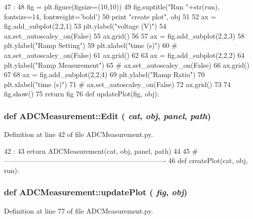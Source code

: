 \begin{DoxyCode}
47                              :
48     fig = plt.figure(figsize=(10,10))
49     fig.suptitle("Run "+str(run), fontsize=14, fontweight='bold')
50     print "create plot", obj
51 
52     ax = fig.add_subplot(2,2,1)
53     plt.ylabel("voltage (V)")
54     ax.set_autoscaley_on(False)
55     ax.grid()
56 
57     ax = fig.add_subplot(2,2,3)
58     plt.ylabel("Ramp Setting")
59     plt.xlabel("time (s)")
60 #    ax.set_autoscaley_on(False)
61     ax.grid()
62 
63     ax = fig.add_subplot(2,2,2)
64     plt.ylabel("Ramp Measurement")
65 #    ax.set_autoscaley_on(False)
66     ax.grid()        
67 
68     ax = fig.add_subplot(2,2,4)
69     plt.ylabel("Ramp Ratio")
70     plt.xlabel("time (s)")
71  #   ax.set_autoscaley_on(False)
72     ax.grid()        
73 
74     fig.show()    
75     return fig
76 
def updatePlot(fig, obj):
\end{DoxyCode}
\hypertarget{namespaceADCMeasurement_a201fc534845b6f266457f888b7544a42}{
\subsubsection[{Edit}]{\setlength{\rightskip}{0pt plus 5cm}def ADCMeasurement::Edit ( {\em cat}, \/   {\em obj}, \/   {\em panel}, \/   {\em path})}}
\label{namespaceADCMeasurement_a201fc534845b6f266457f888b7544a42}


Definition at line 42 of file ADCMeasurement.py.


\begin{DoxyCode}
42                                 :
43     return ADCMeasurement(cat, obj, panel, path)
44 
45 #----------------------------------------------------------------------
46 
def createPlot(cat, obj, run):
\end{DoxyCode}
\hypertarget{namespaceADCMeasurement_a711a07185db6732546b49e91a07bfc3f}{
\subsubsection[{updatePlot}]{\setlength{\rightskip}{0pt plus 5cm}def ADCMeasurement::updatePlot ( {\em fig}, \/   {\em obj})}}
\label{namespaceADCMeasurement_a711a07185db6732546b49e91a07bfc3f}


Definition at line 77 of file ADCMeasurement.py.


